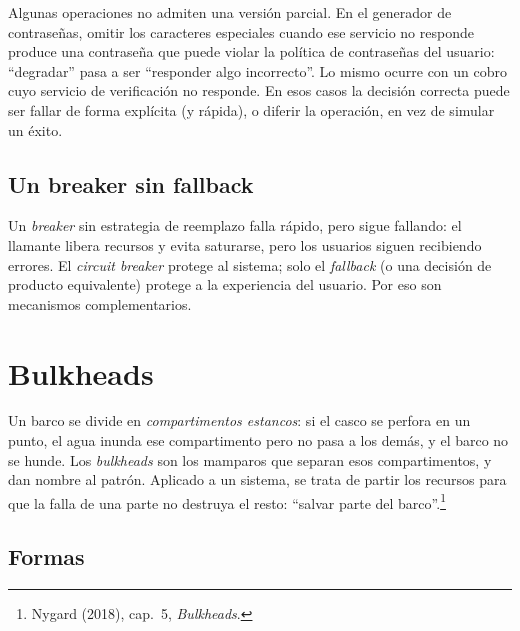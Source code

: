 \documentclass[variant=apuntes,cover=institutional,mode=screen]{ua-engineering-v6-article}
\begin{document}
Algunas operaciones no admiten una versión parcial. En el generador de contraseñas, omitir los caracteres especiales cuando ese servicio no responde produce una contraseña que puede violar la política de contraseñas del usuario: ``degradar'' pasa a ser ``responder algo incorrecto''. Lo mismo ocurre con un cobro cuyo servicio de verificación no responde. En esos casos la decisión correcta puede ser fallar de forma explícita (y rápida), o diferir la operación, en vez de simular un éxito.

\subsection{Un breaker sin fallback}

Un \emph{breaker} sin estrategia de reemplazo falla rápido, pero sigue fallando: el llamante libera recursos y evita saturarse, pero los usuarios siguen recibiendo errores. El \emph{circuit breaker} protege al sistema; solo el \emph{fallback} (o una decisión de producto equivalente) protege a la experiencia del usuario. Por eso son mecanismos complementarios.

\section{Bulkheads}\label{sec:bulkheads}

Un barco se divide en \emph{compartimentos estancos}: si el casco se perfora en un punto, el agua inunda ese compartimento pero no pasa a los demás, y el barco no se hunde. Los \emph{bulkheads} son los mamparos que separan esos compartimentos, y dan nombre al patrón. Aplicado a un sistema, se trata de partir los recursos para que la falla de una parte no destruya el resto: ``salvar parte del barco''.\footnote{Nygard (2018), cap.~5, \emph{Bulkheads}.}

\subsection{Formas}
\end{document}
